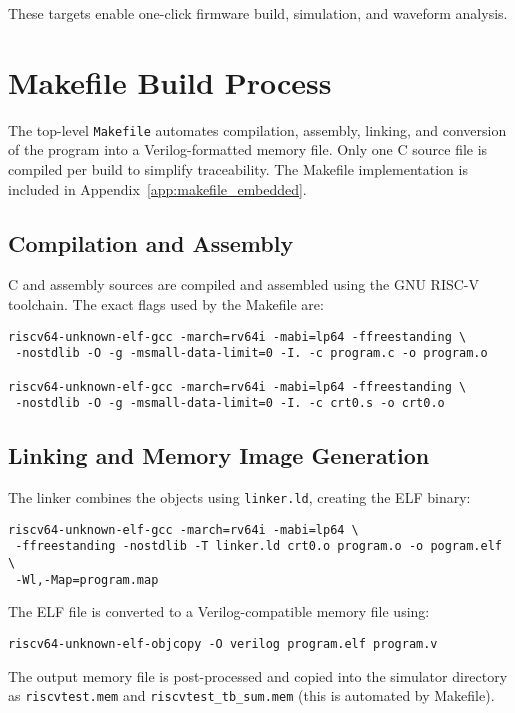 These targets enable one-click firmware build, simulation, and waveform analysis.

\section{Makefile Build Process}
The top-level \texttt{Makefile} automates compilation, assembly, linking, and conversion of the program into a Verilog-formatted memory file.  
Only one C source file is compiled per build to simplify traceability.  
The Makefile implementation is included in Appendix~\ref{app:makefile_embedded}.

\subsection{Compilation and Assembly}
C and assembly sources are compiled and assembled using the GNU RISC-V toolchain. The exact flags used by the Makefile are:

\begin{verbatim}
riscv64-unknown-elf-gcc -march=rv64i -mabi=lp64 -ffreestanding \
 -nostdlib -O -g -msmall-data-limit=0 -I. -c program.c -o program.o

riscv64-unknown-elf-gcc -march=rv64i -mabi=lp64 -ffreestanding \
 -nostdlib -O -g -msmall-data-limit=0 -I. -c crt0.s -o crt0.o
\end{verbatim}

\subsection{Linking and Memory Image Generation}
The linker combines the objects using \texttt{linker.ld}, creating the ELF binary:

\begin{verbatim}
riscv64-unknown-elf-gcc -march=rv64i -mabi=lp64 \
 -ffreestanding -nostdlib -T linker.ld crt0.o program.o -o pogram.elf \
 -Wl,-Map=program.map
\end{verbatim}

The ELF file is converted to a Verilog-compatible memory file using:

\begin{verbatim}
riscv64-unknown-elf-objcopy -O verilog program.elf program.v
\end{verbatim}

The output memory file is post-processed and copied into the simulator directory as \texttt{riscvtest.mem} and \texttt{riscvtest\_tb\_sum.mem} (this is automated by Makefile).

